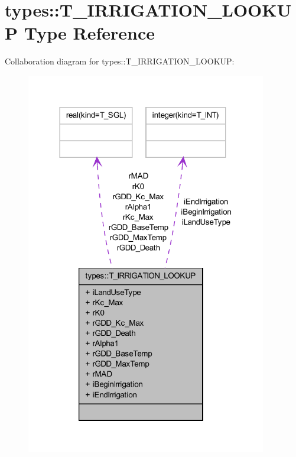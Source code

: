 \hypertarget{typetypes_1_1_t___i_r_r_i_g_a_t_i_o_n___l_o_o_k_u_p}{
\section{types::T\_\-IRRIGATION\_\-LOOKUP Type Reference}
\label{typetypes_1_1_t___i_r_r_i_g_a_t_i_o_n___l_o_o_k_u_p}
}


Collaboration diagram for types::T\_\-IRRIGATION\_\-LOOKUP:\nopagebreak
\begin{figure}[H]
\begin{center}
\leavevmode
\includegraphics[width=298pt]{typetypes_1_1_t___i_r_r_i_g_a_t_i_o_n___l_o_o_k_u_p__coll__graph}
\end{center}
\end{figure}
